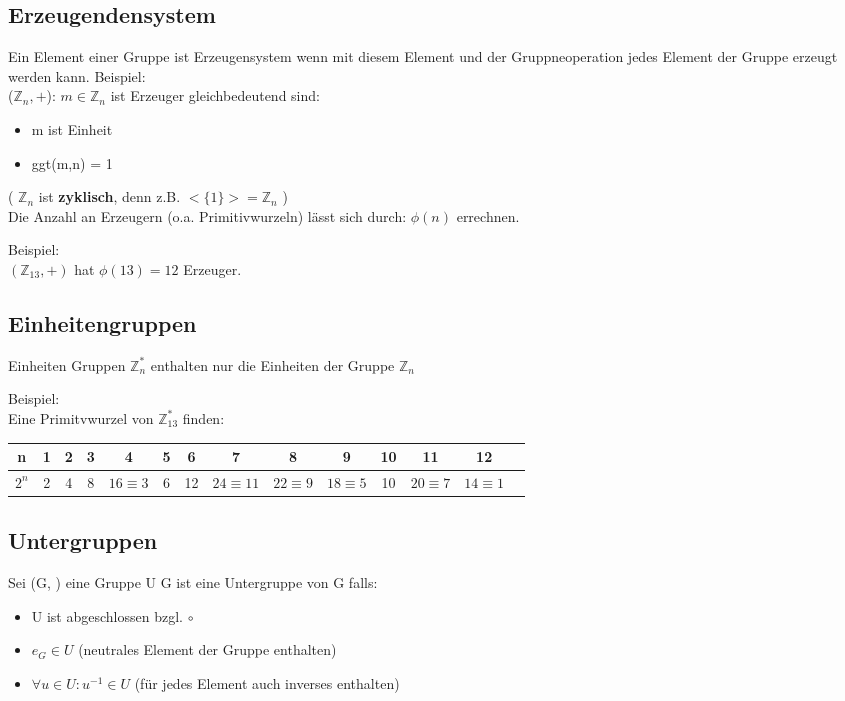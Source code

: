 \documentclass[12pt, letterpaper, twoside]{article}
\begin{document}
\subsection{Erzeugendensystem}
Ein Element einer Gruppe ist Erzeugensystem wenn mit diesem Element und der Gruppneoperation jedes Element der Gruppe erzeugt werden kann.
Beispiel: \\
($\mathbb{Z}_n , + $): $ m \in \mathbb{Z}_n $ ist Erzeuger gleichbedeutend sind:
\begin{itemize}
	\item m ist Einheit
	\item ggt(m,n) = 1
\end{itemize}

\noindent
( $ \mathbb{Z}_n $ ist \textbf{zyklisch}, denn z.B. $ <\{1\}>  =  \mathbb{Z}_n $ ) \\

\noindent
Die Anzahl an Erzeugern (o.a. Primitivwurzeln) lässt sich durch: $ \phi (n) $ errechnen.

Beispiel: \\
\indent
$ ( \mathbb{Z}_{13}, +)$ hat $ \phi(13) = 12 $ Erzeuger.



\subsection{Einheitengruppen}
Einheiten Gruppen $\mathbb{Z}_{n}^* $ enthalten nur die Einheiten der Gruppe $ \mathbb{Z}_n $

Beispiel: \\
Eine Primitvwurzel von $ \mathbb{Z}_{13}^* $ finden: \\
\begin{tabular}{c | c c c c c c c c c c c c c}
n & 1 & 2 & 3 & 4 & 5 & 6 & 7 & 8 & 9 & 10 & 11 & 12 \\
\hline
$ 2^n $& 2 & 4 & 8 & $ 16 \equiv 3 $ & 6 & 12 & $ 24 \equiv 11 $& $ 22 \equiv 9$ & $18 \equiv 5$ & 10 & $20 \equiv 7$ & $14 \equiv 1$ \\
\end{tabular}

\subsection{Untergruppen}
Sei (G, \circ) eine Gruppe
U \subset G ist eine Untergruppe von G falls:

\begin{itemize}
	\item U ist abgeschlossen bzgl.  $ \circ $
	\item $ e_G \in U $ (neutrales Element der Gruppe enthalten)
	\item $ \forall u \in U: u^{-1} \in U $ (für jedes Element auch inverses enthalten)
\end{itemize}
\end{document}
